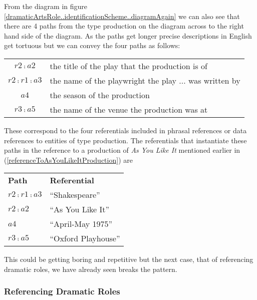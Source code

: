 From the diagram in figure \ref{dramaticArtsRole..identificationScheme..diagramAgain} 
we can also see that there are 4 paths from the type production on the diagram
across to the right hand side of the diagram. 
As the paths get longer precise descriptions in English  get tortuous but we can convey the four paths as follows:
\begin{center}
\begin{tabular}{c p{8cm}}
$r2 \comp a2$           & the title of the play that the production is of\\
$r2 \comp r1 \comp a3$  & the name of the playwright the play ... was written by\\
$a4$                    & the season of the production\\
$r3 \comp a5$           & the name of the venue the production was at\\
\end{tabular}
\end{center} 

These correspond to the four referentials included in phrasal references or data references to entities of 
type production.
The referentials that instantiate these paths in 
the reference to a production of 
\textit{As You Like It} mentioned earlier in (\ref{referenceToAsYouLikeItProduction}) 
are\\
\newline
\begin{center}
\begin{tabular}{l l}
\textbf{Path}          & \textbf{Referential} \\
$r2 \comp r1 \comp a3$ & ``Shakespeare''       \\
$r2\comp a2$           & ``As You Like It''   \\
$a4$                   & ``April-May 1975''   \\
$r3 \comp a5$          & ``Oxford Playhouse''
\end{tabular}
\end{center}

This could be getting boring and repetitive but the next case, that of referencing dramatic roles, we have already seen breaks the pattern.

\subsubsection{Referencing Dramatic Roles}

